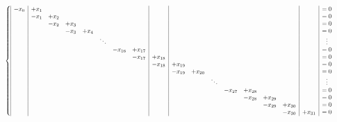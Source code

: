 \documentclass[notitlepage]{report}
\begin{document}
\begin{equation}
\nonumber
\resizebox{\hsize}{!}{
$\left\{
\begin{array}{|c|ccccccc|c|ccccccc|c|c}
-x_0 & +x_1  &      &      &         &        &            &         &         &         &            &        &            &         &         &         &         &= 0 \\
     &  -x_1 & +x_2 &      &         &        &            &         &         &         &            &        &            &         &         &         &         &= 0 \\
     &       & -x_2 & +x_3 &         &        &            &         &         &         &            &        &            &         &         &         &         &= 0 \\
     &       &      & -x_3 & +x_4    &        &            &         &         &         &            &        &            &         &         &         &         &= 0 \\
     &       &      &      &         & \ddots &            &         &         &         &            &        &            &         &         &         &         &  \vdots  \\
     &       &      &      &         &        &    -x_{16} & +x_{17} &         &         &            &        &            &         &         &         &         &= 0 \\
     &       &      &      &         &        &            & -x_{17} & +x_{18} &         &            &        &            &         &         &         &         &= 0 \\
     &       &      &      &         &        &            &         & -x_{18} & +x_{19} &            &        &            &         &         &         &         &= 0 \\
     &       &      &      &         &        &            &         &         & -x_{19} & +x_{20}    &        &            &         &         &         &         &= 0 \\
     &       &      &      &         &        &            &         &         &         &            & \ddots &            &         &         &         &         &  \vdots  \\
     &       &      &      &         &        &            &         &         &         &            &        &    -x_{27} & +x_{28} &         &         &         &= 0 \\
     &       &      &      &         &        &            &         &         &         &            &        &            & -x_{28} & +x_{29} &         &         &= 0 \\
     &       &      &      &         &        &            &         &         &         &            &        &            &         & -x_{29} & +x_{30} &         &= 0 \\
     &       &      &      &         &        &            &         &         &         &            &        &            &         &         & -x_{30} & +x_{31} &= 0 \\
\end{array}
\right.$
}
\end{equation}
\end{document}
